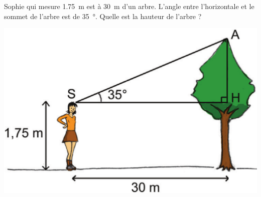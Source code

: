 
\begin{exercice}\label{exo2smath-0149}

    Sophie qui mesure \SI{1.75}{\meter} est à \SI{30}{\meter} d'un arbre. L'angle entre l'horizontale et le sommet de l'arbre est de \SI{35}{\degree}. Quelle est la hauteur de l'arbre ?

\includegraphics[width=\linewidth]{arbrecosinus.pdf}



\end{exercice}
